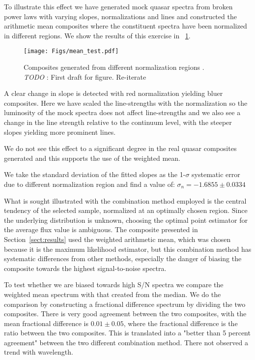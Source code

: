 \documentclass{aa}    %
\newcommand{\figref}[1]{\ref{fig:#1}}
\newcommand{\Fig}[1]{\figurename~\figref{#1}}
\newcommand{\fig}[1]{\Fig{#1}}
\newcommand{\figlabel}[1]{\label{fig:#1}}
\newcommand{\sectionname}{Section}
\newcommand{\Sect}[1]{\sectionname~\ref{sect:#1}}
\newcommand{\sect}[1]{\Sect{#1}}
\newcommand{\todo}[3]{{\color{#2}\emph{#1}: #3}}
\newcommand{\jstodo}[1]{\todo{ \\TODO }{green}{#1}}
\begin{document}
To illustrate this effect we have generated mock quasar spectra from broken power laws with varying slopes, normalizations and lines and constructed the arithmetic mean composites where the constituent spectra have been normalized in different regions. We show the results of this exercise in \fig{mean_test}.


 \begin{figure}[hbtp]
   \centering
   \texttt{[image: Figs/mean\_test.pdf]}
   \caption[]{Composites generated from different normalization regions . \jstodo{First draft for figure. Re-iterate}}
  \figlabel{mean_test}
 \end{figure}


 A clear change in slope is detected with red normalization yielding bluer composites. Here we have scaled the line-strengths with the normalization so the luminosity of the mock spectra does not affect line-strengths and we also see a change in the line strength relative to the continuum level, with the steeper slopes yielding more prominent lines.
 
We do not see this effect to a significant degree in the real quasar composites generated and this supports the use of the weighted mean.

We take the standard deviation of the fitted slopes as the 1-$\sigma$ systematic error due to different normalization region and find a value of: $\sigma_{n} = -1.6855 \pm 0.0334$


What is sought illustrated with the combination method employed is the central tendency of the selected sample, normalized at an optimally chosen region. Since the underlying distribution is unknown, choosing the optimal point estimator for the average flux value is ambiguous. The composite presented in \sect{results} used the weighted arithmetic mean, which was chosen because it is the maximum likelihood estimator, but this combination method has systematic differences from other methods, especially the danger of biasing the composite towards the highest signal-to-noise spectra. 

To test whether we are biased towards high S/N spectra we compare the weighted mean spectrum with that created from the median. We do the comparison by constructing a fractional difference spectrum by dividing the two composites. There is very good agreement between the two composites, with the mean fractional difference is $0.01 \pm 0.05$, where the fractional difference is the ratio between the two composites. This is translated into a "better than 5 percent agreement" between the two different combination method. There not observed a trend with wavelength.
\end{document}
